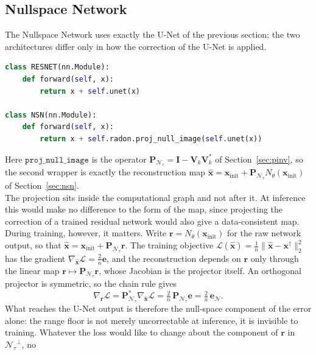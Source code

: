 \documentclass{article}
\numberwithin{equation}{section}
\begin{document}
\subsection{Nullspace Network}\label{sec:nsn-impl}
The Nullspace Network uses exactly the U-Net of the previous section; the two
architectures differ only in how the correction of the U-Net is applied.
\begin{lstlisting}[language=Python, caption=The two wrappers]
class RESNET(nn.Module):
    def forward(self, x):
        return x + self.unet(x)

class NSN(nn.Module):
    def forward(self, x):
        return x + self.radon.proj_null_image(self.unet(x))
\end{lstlisting}
Here $\texttt{proj\_null\_image}$ is the operator
$\mathbf{P}_{\mathcal{N}_\tau}=\mathbf{I}-\mathbf{V}_k\mathbf{V}_k^{*}$ of
Section~\ref{sec:pinv}, so the second wrapper is exactly the reconstruction map
$\hat{\mathbf{x}}=\mathbf{x}_\text{init}+
\mathbf{P}_{\mathcal{N}_\tau}N_\theta(\mathbf{x}_\text{init})$ of
Section~\ref{sec:nsn}.\\
The projection sits inside the computational graph and not after it.
At inference this would make no difference to the form of the map, since projecting the correction of a
trained residual network would also give a data-consistent map. During training, however,
it matters. Write $\mathbf{r}=N_\theta(\mathbf{x}_\text{init})$ for the raw network output, so that
$\hat{\mathbf{x}}=\mathbf{x}_\text{init}+\mathbf{P}_{\mathcal{N}_\tau}\mathbf{r}$. The training objective
$\mathcal{L}(\hat{\mathbf{x}})=\frac1n\lVert\hat{\mathbf{x}}-\mathbf{x}^\dagger\rVert_2^2$ has the gradient
$\nabla_{\!\hat{\mathbf{x}}}\mathcal{L}=\frac2n\mathbf{e}$, and the reconstruction depends on $\mathbf{r}$ only
through the linear map $\mathbf{r}\mapsto\mathbf{P}_{\mathcal{N}_\tau}\mathbf{r}$, whose Jacobian is the
projector itself. An orthogonal projector is symmetric, so the chain rule gives
\begin{equation}\label{eq:grad}
\nabla_{\!\mathbf{r}}\mathcal{L}=\mathbf{P}_{\mathcal{N}_\tau}^{*}\nabla_{\!\hat{\mathbf{x}}}\mathcal{L}
=\tfrac2n\,\mathbf{P}_{\mathcal{N}_\tau}\mathbf{e}=\tfrac2n\,\mathbf{e}_{\mathcal{N}}.
\end{equation}
What reaches the U-Net output is therefore the null-space component of the error alone: the range floor
is not merely uncorrectable at inference, it is invisible to training. Whatever the loss would like to change
about the component of $\mathbf{r}$ in ${\mathcal{N}_\tau}^{\perp}$, no
\end{document}
